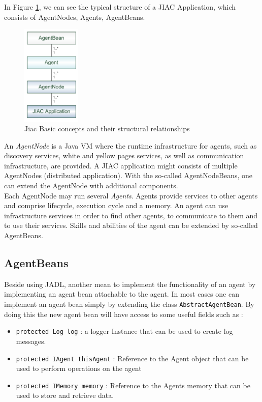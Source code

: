 In Figure \ref{fig:jiac_basic}, we can see the typical structure of a JIAC Application, which consists of AgentNodes, Agents, AgentBeans.
\begin{figure}[h]
	\centering
		\includegraphics[width=0.25\textwidth]{images/jiac_basic.png}
		\caption{Jiac Basic concepts and their structural relationships \cite{JIACMAN10}}
	\label{fig:jiac_basic}
\end{figure}
An \textit{AgentNode} is a Java VM where the runtime infrastructure for agents, such as discovery services, white and yellow pages services, as well as communication infrastructure, are provided. A JIAC application might consists of multiple AgentNodes (distributed application). With the so-called AgentNodeBeans, one can extend the AgentNode with additional components.\\

Each AgentNode may run several \textit{Agents}. Agents provide services to other agents
and comprise lifecycle, execution cycle and a memory. An agent can use infrastructure
services in order to find other agents, to communicate to them and to use their services.
Skills and abilities of the agent can be extended by so-called AgentBeans.\\


\subsection{AgentBeans}
Beside using JADL, another mean to implement the functionality of an agent by implementing an agent bean attachable to the agent.
In most cases one can implement an agent bean simply by extending the class \texttt{AbstractAgentBean}. By doing this the new agent bean will have access to some useful fields such as :
\begin{itemize}
	\item \texttt{protected Log log} : a logger Instance that can be used to create log messages.
	\item \texttt{protected IAgent thisAgent} : Reference to the Agent object that can be used to perform operations on the agent
	\item \texttt{protected IMemory memory} : Reference to the Agents memory that can be used to store and retrieve data.
\end{itemize}\\\\

